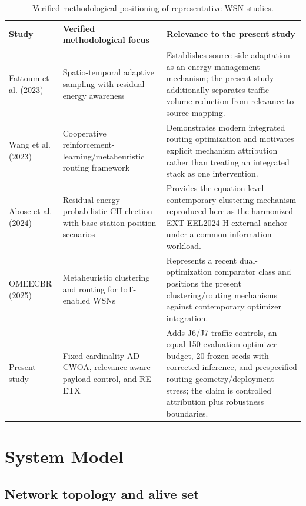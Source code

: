 \documentclass[pdflatex,sn-mathphys-num]{sn-jnl}
\begin{document}
\begin{table}[t]
\caption{Verified methodological positioning of representative WSN studies.}
\label{tab:related}
\centering
\scriptsize
\begin{tabularx}{\textwidth}{>{\raggedright\arraybackslash}p{} >{\raggedright\arraybackslash}p{} >{\raggedright\arraybackslash}X}
\toprule
Study & Verified methodological focus & Relevance to the present study\\
\midrule
Fattoum et al. (2023)~\cite{fattoum2023} & Spatio-temporal adaptive sampling with residual-energy awareness & Establishes source-side adaptation as an energy-management mechanism; the present study additionally separates traffic-volume reduction from relevance-to-source mapping.\\
Wang et al. (2023)~\cite{wang2023} & Cooperative reinforcement-learning/metaheuristic routing framework & Demonstrates modern integrated routing optimization and motivates explicit mechanism attribution rather than treating an integrated stack as one intervention.\\
Abose et al. (2024)~\cite{abose2024} & Residual-energy probabilistic CH election with base-station-position scenarios & Provides the equation-level contemporary clustering mechanism reproduced here as the harmonized EXT-EEL2024-H external anchor under a common information workload.\\
OMEECBR (2025)~\cite{edakulathur2025} & Metaheuristic clustering and routing for IoT-enabled WSNs & Represents a recent dual-optimization comparator class and positions the present clustering/routing mechanisms against contemporary optimizer integration.\\
Present study & Fixed-cardinality AD-CWOA, relevance-aware payload control, and RE-ETX & Adds J6/J7 traffic controls, an equal 150-evaluation optimizer budget, 20 frozen seeds with corrected inference, and prespecified routing-geometry/deployment stress; the claim is controlled attribution plus robustness boundaries.\\
\bottomrule
\end{tabularx}
\end{table}

\section{System Model}

\subsection{Network topology and alive set}
\end{document}
